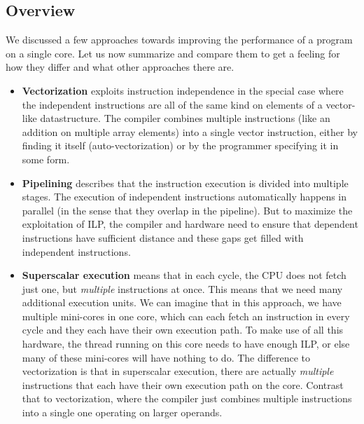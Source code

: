 \documentclass[main.tex]{subfiles}
\begin{document}
\subsection{Overview}
We discussed a few approaches towards improving the performance of a program on a single core. Let us now summarize and compare them to get a feeling for how they differ and what other approaches there are.
\begin{itemize}
  \item \textbf{Vectorization} exploits instruction independence in the special case where the independent instructions are all of the same kind on elements of a vector-like datastructure. The compiler combines multiple instructions (like an addition on multiple array elements) into a single vector instruction, either by finding it itself (auto-vectorization) or by the programmer specifying it in some form.
  \item \textbf{Pipelining} describes that the instruction execution is divided into multiple stages. The execution of independent instructions automatically happens in parallel (in the sense that they overlap in the pipeline). But to maximize the exploitation of ILP, the compiler and hardware need to ensure that dependent instructions have sufficient distance and these gaps get filled with independent instructions.
  \item \textbf{Superscalar execution} means that in each cycle, the CPU does not fetch just one, but \textit{multiple} instructions at once. This means that we need many additional execution units. We can imagine that in this approach, we have multiple mini-cores in one core, which can each fetch an instruction in every cycle and they each have their own execution path. To make use of all this hardware, the thread running on this core needs to have enough ILP, or else many of these mini-cores will have nothing to do. The difference to vectorization is that in superscalar execution, there are actually \textit{multiple} instructions that each have their own execution path on the core. Contrast that to vectorization, where the compiler just combines multiple instructions into a single one operating on larger operands.
\end{itemize}
\end{document}
